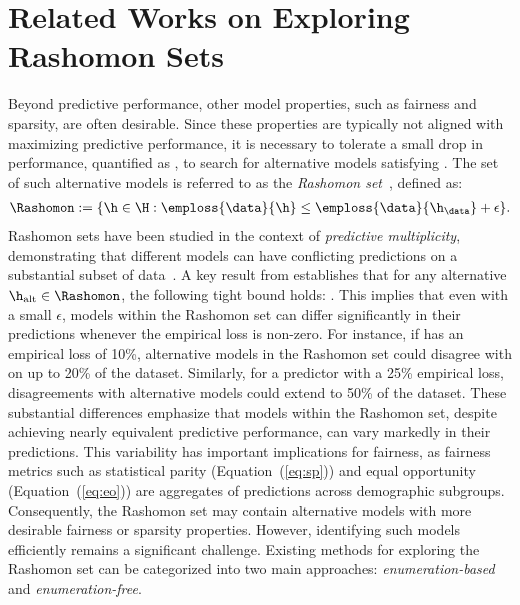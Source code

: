 \section{Related Works on Exploring Rashomon Sets}
\label{sec:related_works}

Beyond predictive performance, other model properties, such as fairness and sparsity, are often desirable. Since these properties are typically not aligned with maximizing predictive performance, it is necessary to tolerate a small drop in performance, quantified as \smash{$\epsilon$}, to search for alternative models  satisfying .  The set of such alternative models is referred to as the \emph{Rashomon set}~\citep{breiman2001statistical,fisher2019all}, defined as:
\begin{align}
    \Rashomon := \{\h\in \H : \emploss{\data}{\h}\leq \emploss{\data}{\h_{\data}}+\epsilon\}.
\end{align}
Rashomon sets have been studied in the context of \emph{predictive multiplicity}, demonstrating that 
different models can have conflicting predictions on a substantial subset of data~\citep{marx2020predictive,DBLP:conf/nips/HsuC22,DBLP:conf/aaai/Watson-DanielsP23}. 
A key result from \citet{marx2020predictive} establishes that for any alternative $\h_{\text{alt}}\in \Rashomon$, the following tight bound holds:
.
This implies that even with a small $\epsilon$, models within the Rashomon set can differ significantly in their predictions whenever the empirical loss \smash{$\emploss{\data}{\h_{\data}}$} is non-zero. For instance, if \smash{$\h_{\data}$} has an empirical loss of 10\%, alternative models in the Rashomon set could disagree with \smash{$\h_{\data}$} on up to 20\% of the dataset. Similarly, for a predictor \smash{$\h_{\data}$} with a 25\% empirical loss, disagreements with alternative models could extend to 50\% of the dataset. These substantial differences emphasize that models within the Rashomon set, despite achieving nearly equivalent predictive performance, can vary markedly in their predictions. This variability has important implications for fairness, as fairness metrics such as statistical parity (Equation~(\ref{eq:sp})) and equal opportunity (Equation~(\ref{eq:eo})) are aggregates of predictions across demographic subgroups. Consequently, the Rashomon set may contain alternative models with more desirable fairness or sparsity properties. However, identifying such models efficiently remains a significant challenge. Existing methods for exploring the Rashomon set can be categorized into two main approaches: \emph{enumeration-based} and \emph{enumeration-free}.

